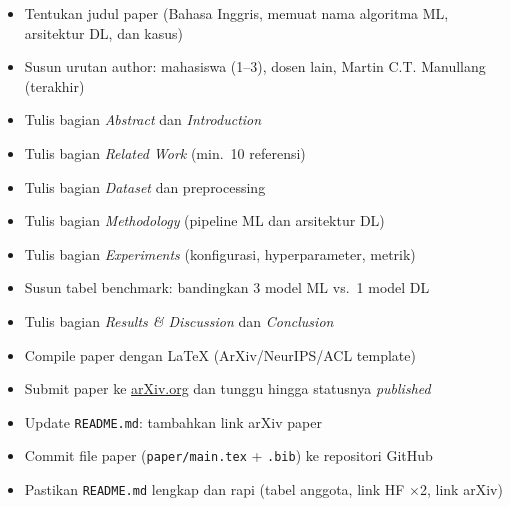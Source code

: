 \documentclass[11pt,a4paper]{article}
\begin{document}
\begin{tcolorbox}[enhanced, colback=checkpointbg, colframe=accent, fonttitle=\bfseries,
  title={Checkpoint 4 (Final) --- 29 April 2026: Paper ArXiv}]
\begin{itemize}[leftmargin=1.5em, label=$\square$, noitemsep]
  \item Tentukan judul paper (Bahasa Inggris, memuat nama algoritma ML, arsitektur DL, dan kasus)
  \item Susun urutan author: mahasiswa (1--3), dosen lain, Martin C.T. Manullang (terakhir)
  \item Tulis bagian \textit{Abstract} dan \textit{Introduction}
  \item Tulis bagian \textit{Related Work} (min.\ 10 referensi)
  \item Tulis bagian \textit{Dataset} dan preprocessing
  \item Tulis bagian \textit{Methodology} (pipeline ML dan arsitektur DL)
  \item Tulis bagian \textit{Experiments} (konfigurasi, hyperparameter, metrik)
  \item Susun tabel benchmark: bandingkan 3 model ML vs.\ 1 model DL
  \item Tulis bagian \textit{Results \& Discussion} dan \textit{Conclusion}
  \item Compile paper dengan LaTeX (ArXiv/NeurIPS/ACL template)
  \item Submit paper ke \href{https://arxiv.org}{arXiv.org} dan tunggu hingga statusnya \textit{published}
  \item Update \texttt{README.md}: tambahkan link arXiv paper
  \item Commit file paper (\texttt{paper/main.tex} + \texttt{.bib}) ke repositori GitHub
  \item Pastikan \texttt{README.md} lengkap dan rapi (tabel anggota, link HF $\times$2, link arXiv)
\end{itemize}
\end{tcolorbox}
\end{document}
